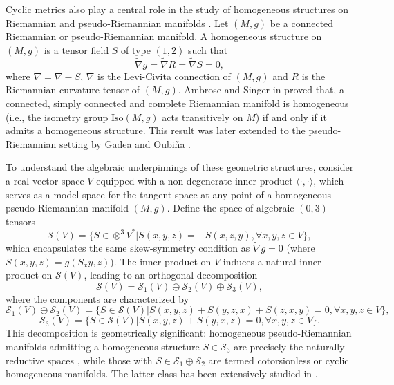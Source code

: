 \documentclass[reqno]{amsart}
\theoremstyle{definition}
\begin{document}
Cyclic metrics also play a central role in the study of homogeneous structures on Riemannian and pseudo-Riemannian manifolds \cite{cl19,tv83}. Let $(M,g)$ be a connected Riemannian or pseudo-Riemannian manifold. A homogeneous structure  on $(M,g)$ is a tensor field $S$ of type $(1,2)$ such that
$$\widetilde{\nabla}g=\widetilde{\nabla}R=\widetilde{\nabla}S=0,$$
where $\widetilde{\nabla}=\nabla-S$, $\nabla$ is the Levi-Civita connection of $(M,g)$ and $R$ is the Riemannian curvature tensor of $(M,g)$.
Ambrose and Singer in \cite{as58} proved that,  a connected, simply connected and complete Riemannian manifold is homogeneous (i.e., the isometry group $\mathrm{Iso}(M,g)$ acts transitively on $M$) if and only if it admits a homogeneous structure.
This result was later extended to the pseudo-Riemannian setting by Gadea and Oubi\~{n}a \cite{go97}.


To understand the algebraic underpinnings of these geometric structures, consider a real vector space $V$
equipped with a non-degenerate inner product $\langle\cdot,\cdot\rangle$,
which serves as a model space for the tangent space at any point of a homogeneous pseudo-Riemannian manifold $(M,g)$. Define the space of algebraic $(0,3)$-tensors
 $$\mathcal{S}(V)=\{S\in \otimes^{3}V^{*}|S(x,y,z)=-S(x,z,y), \forall x,y,z\in V\},$$
 which encapsulates the same skew-symmetry condition as $\widetilde{\nabla}g=0$  (where $S(x,y,z)=g(S_x{y},z)$).
 The inner product on $V$ induces a natural inner product on  $\mathcal{S}(V)$, leading to an orthogonal decomposition \cite{go97,tv83}
$$\mathcal{S}(V)=\mathcal{S}_{1}(V)\oplus \mathcal{S}_{2}(V)\oplus\mathcal{S}_{3}(V),$$
where  the components are characterized by
$$\mathcal{S}_{1}(V)\oplus \mathcal{S}_{2}(V)
=\{S\in\mathcal{S}(V)|S(x,y,z)+S(y,z,x)+S(z,x,y)=0, \forall x,y,z\in V \},$$
$$\mathcal{S}_{3}(V)=\{S\in\mathcal{S}(V)|S(x,y,z)+S(y,x,z)=0,\forall x,y,z\in V\}.$$
This decomposition is geometrically significant: homogeneous pseudo-Riemannian manifolds admitting a homogeneous structure $S\in \mathcal{S}_{3}$ are precisely the naturally reductive spaces \cite{go97},
while those with $S\in \mathcal{S}_{1}\oplus \mathcal{S}_{2}$ are termed cotorsionless or cyclic homogeneous manifolds. The latter class has been extensively studied in \cite{bie97,deleo14,deleoM08,fp06,ggo15,ggo16,kt87,pv91}.
\end{document}
